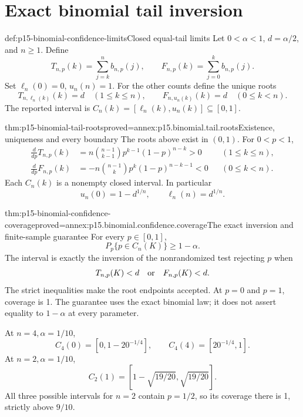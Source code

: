 \section{Exact binomial tail inversion}

\begin{hbdefinition}{def:p15-binomial-confidence-limits}{Closed equal-tail limits}
Let \(0<\alpha<1\), \(d=\alpha/2\), and \(n\geq1\).
Define
\[
 T_{n,p}(k)=\sum_{j=k}^n b_{n,p}(j),\qquad
 F_{n,p}(k)=\sum_{j=0}^k b_{n,p}(j).
\]
Set \(\ell_n(0)=0\), \(u_n(n)=1\). For the other
counts define the unique roots
\[
 T_{n,\ell_n(k)}(k)=d\quad(1\leq k\leq n),\qquad
 F_{n,u_n(k)}(k)=d\quad(0\leq k<n).
\]
The reported interval is
\(C_n(k)=[\ell_n(k),u_n(k)]\subseteq[0,1]\).
\end{hbdefinition}

\begin{hblemma}{thm:p15-binomial-tail-roots}{proved=annex:p15.binomial.tail.roots}{Existence, uniqueness and every boundary}
The roots above exist in \((0,1)\). For \(0<p<1\),
\[
\begin{aligned}
 \frac{d}{dp}T_{n,p}(k)
     &=n\binom{n-1}{k-1}p^{k-1}(1-p)^{n-k}>0
                                      &&(1\leq k\leq n),\\
 \frac{d}{dp}F_{n,p}(k)
     &=-n\binom{n-1}{k}p^k(1-p)^{n-k-1}<0
                                      &&(0\leq k<n).
\end{aligned}
\]
Each \(C_n(k)\) is a nonempty closed interval.
In particular
\[
                u_n(0)=1-d^{1/n},\qquad \ell_n(n)=d^{1/n}.
\]
\end{hblemma}

\begin{hbtheorem}{thm:p15-binomial-confidence-coverage}{proved=annex:p15.binomial.confidence.coverage}{The exact inversion and finite-sample guarantee}
For every \(p\in[0,1]\),
\[
                            P_p\{p\in C_n(K)\}\geq1-\alpha.
\]
The interval is exactly the inversion of the nonrandomized
test rejecting \(p\) when
\[
                       T_{n,p}(K)<d\quad\hbox{or}\quad F_{n,p}(K)<d.
\]
The strict inequalities make the root endpoints accepted.
At \(p=0\) and \(p=1\), coverage is 1.
The guarantee uses the exact binomial law; it does not
assert equality to \(1-\alpha\) at every parameter.

At \(n=4,\alpha=1/10\),
\[
 C_4(0)=[0,1-20^{-1/4}],\qquad C_4(4)=[20^{-1/4},1].
\]
At \(n=2,\alpha=1/10\),
\[
                       C_2(1)=[1-\sqrt{19/20},\sqrt{19/20}].
\]
All three possible intervals for \(n=2\) contain \(p=1/2\),
so its coverage there is 1, strictly above \(9/10\).
\end{hbtheorem}

